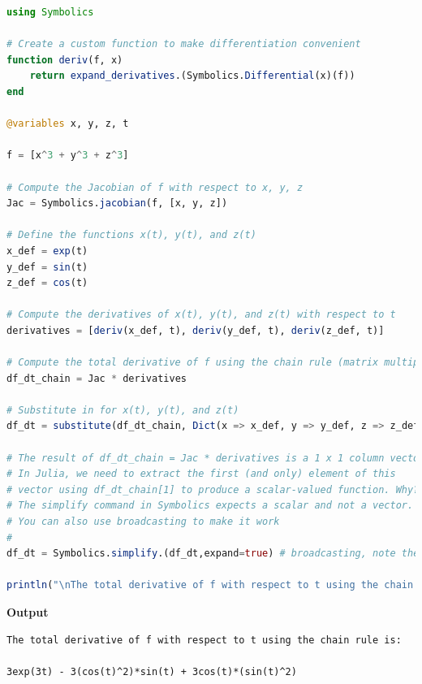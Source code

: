 \begin{lstlisting}[language=Julia,style=mystyle]
using Symbolics

# Create a custom function to make differentiation convenient
function deriv(f, x)
    return expand_derivatives.(Symbolics.Differential(x)(f))
end

@variables x, y, z, t

f = [x^3 + y^3 + z^3]

# Compute the Jacobian of f with respect to x, y, z
Jac = Symbolics.jacobian(f, [x, y, z])

# Define the functions x(t), y(t), and z(t)
x_def = exp(t)
y_def = sin(t)
z_def = cos(t)

# Compute the derivatives of x(t), y(t), and z(t) with respect to t
derivatives = [deriv(x_def, t), deriv(y_def, t), deriv(z_def, t)]

# Compute the total derivative of f using the chain rule (matrix multiplication)
df_dt_chain = Jac * derivatives

# Substitute in for x(t), y(t), and z(t)
df_dt = substitute(df_dt_chain, Dict(x => x_def, y => y_def, z => z_def))
    
# The result of df_dt_chain = Jac * derivatives is a 1 x 1 column vector. 
# In Julia, we need to extract the first (and only) element of this 
# vector using df_dt_chain[1] to produce a scalar-valued function. Why?
# The simplify command in Symbolics expects a scalar and not a vector.
# You can also use broadcasting to make it work
#    
df_dt = Symbolics.simplify.(df_dt,expand=true) # broadcasting, note the dot

println("\nThe total derivative of f with respect to t using the chain rule is:\n\n", df_dt)

\end{lstlisting}
\textbf{Output} 
\begin{verbatim}
The total derivative of f with respect to t using the chain rule is:

3exp(3t) - 3(cos(t)^2)*sin(t) + 3cos(t)*(sin(t)^2)
\end{verbatim}

\vspace*{.2cm}

